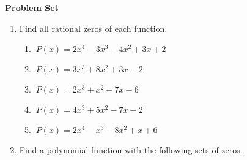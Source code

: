 \textbf{Problem Set}

\vspce
\begin{enumerate}[label = \Alph*. ]

\item 
Find all rational zeros of each function. 


\begin{enumerate}[label = \arabic*. ]

\item \hspce $\ {P(x) = 
2 x^{4} - 3 x^{3} - 4 x^{2} + 3 x + 2}$
\vspce
\item \hspce $\ {P(x) = 3x^{3} + 8 x^{2} + 3 x - 2}$
\vspce
\item \hspce $\ {P(x) = 2x^{3} + x^{2} - 7 x - 6}$
\vspce
\item \hspce $\ {P(x) = 4x^{3} + 5 x^{2} - 7 x - 2}$
\vspce
\item \hspce $\ {P(x) = 2x^{4} - x^{3} - 8 x^{2} + x + 6}$


\end{enumerate}



\item 
Find a polynomial function with the following sets of zeros. 

\begin{enumerate}[label = \arabic*. ]
\end{enumerate}  
 



\end{enumerate}